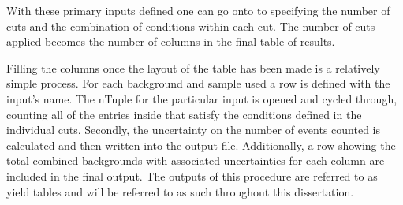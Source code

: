 With these primary inputs defined one can go onto to specifying the number of cuts and the combination of conditions within each cut.
The number of cuts applied becomes the number of columns in the final table of results.

Filling the columns once the layout of the table has been made is a relatively simple process.
For each background and sample used a row is defined with the input's name.
The nTuple for the particular input is opened and cycled through, counting all of the entries inside that satisfy the conditions defined in the individual cuts.
Secondly, the uncertainty on the number of events counted is calculated and then written into the output file.
Additionally, a row showing the total combined backgrounds with associated uncertainties for each column are included in the final output.
The outputs of this procedure are referred to as yield tables and will be referred to as such throughout this dissertation.
